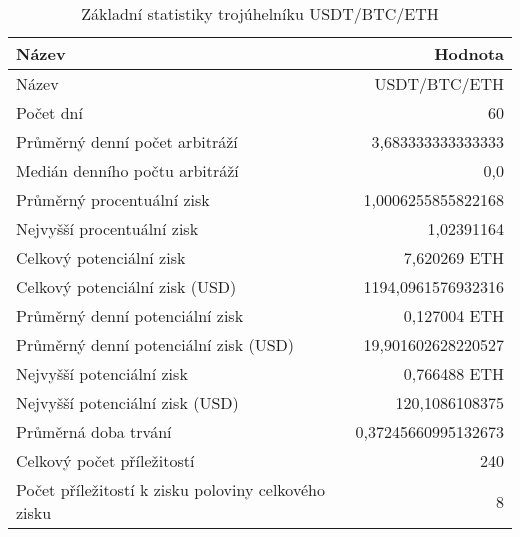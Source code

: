 \begin{table}\centering
\caption{Základní statistiky trojúhelníku USDT/BTC/ETH}
\label{USDTBTCETH_stats}
\begin{tabular}{|| l | r ||}
\hline Název & Hodnota \\ 
\hline\hline Název & USDT/BTC/ETH \\ 
\hline Počet dní & 60 \\ 
\hline Průměrný denní počet arbitráží & 3,683333333333333 \\ 
\hline Medián denního počtu arbitráží & 0,0 \\ 
\hline Průměrný procentuální zisk & 1,0006255855822168 \\ 
\hline Nejvyšší procentuální zisk & 1,02391164 \\ 
\hline Celkový potenciální zisk & 7,620269 ETH \\ 
\hline Celkový potenciální zisk (USD) & 1194,0961576932316 \\ 
\hline Průměrný denní potenciální zisk & 0,127004 ETH \\ 
\hline Průměrný denní potenciální zisk (USD) & 19,901602628220527 \\ 
\hline Nejvyšší potenciální zisk & 0,766488 ETH \\ 
\hline Nejvyšší potenciální zisk (USD) & 120,1086108375 \\ 
\hline Průměrná doba trvání & 0,37245660995132673 \\ 
\hline Celkový počet příležitostí & 240 \\ 
\hline Počet příležitostí k zisku poloviny celkového zisku & 8 \\ 
\hline
\end{tabular}
\end{table}